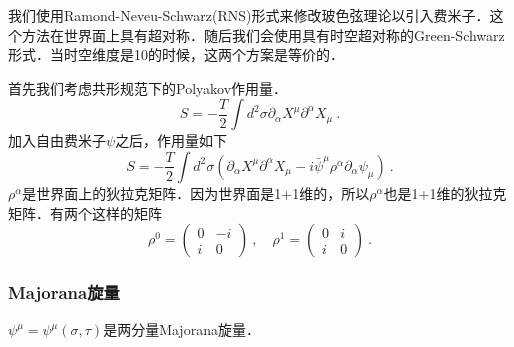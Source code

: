 
我们使用Ramond-Neveu-Schwarz(RNS)形式来修改玻色弦理论以引入费米子．这个方法在世界面上具有超对称．随后我们会使用具有时空超对称的Green-Schwarz形式．当时空维度是10的时候，这两个方案是等价的．

首先我们考虑共形规范下的Polyakov作用量．
\begin{equation}
S = - \frac{T}{2} \int d^2 \sigma \partial_\alpha X^\mu \partial^\alpha X_\mu~.
\end{equation}
加入自由费米子$\psi$之后，作用量如下
\begin{equation}
S = - \frac{T}{2} \int d^2\sigma (\partial_\alpha X^\mu \partial^\alpha X_\mu - i \bar\psi^\mu \rho^\alpha \partial_\alpha \psi_\mu)~.
\end{equation}
$\rho^\alpha$是世界面上的狄拉克矩阵．因为世界面是1+1维的，所以$\rho^\alpha$也是1+1维的狄拉克矩阵．有两个这样的矩阵
\begin{equation}
\rho^0 = \begin{pmatrix}
0 & -i \\
i & 0
\end{pmatrix}~, \quad \rho^1 = \begin{pmatrix}
0 & i \\
i & 0
\end{pmatrix}~.
\end{equation}

\subsubsection{Majorana旋量}
$\psi^\mu = \psi^\mu(\sigma,\tau)$是两分量Majorana旋量．





